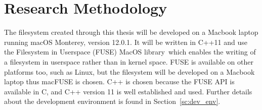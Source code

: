 
\section{Research Methodology}%

The filesystem created through this thesis will be developed on a Macbook laptop running macOS Monterey, version 12.0.1. It will be written in C++11 and use the Filesystem in Userspace (FUSE) MacOS library\,\cite{HomeMacFUSE} which enables the writing of a filesystem in userspace rather than in kernel space. FUSE is available on other platforms too, such as Linux, but the filesystem will be developed on a Macbook laptop thus macFUSE is chosen. C++ is chosen because the FUSE API is available in C, and C++ version 11 is well established and used. Further details about the development environment is found in Section~\ref{sc:dev_env}.

